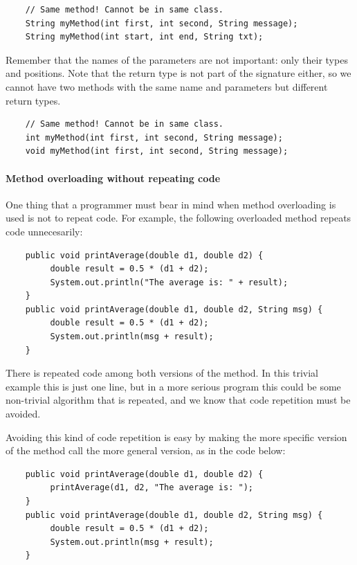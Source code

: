 \begin{verbatim}
    // Same method! Cannot be in same class.
    String myMethod(int first, int second, String message);
    String myMethod(int start, int end, String txt);
\end{verbatim}

Remember that the names of the parameters are not important: only their types and
positions. Note that the return type is not part of the signature
either, so we cannot have two methods with the same name and
parameters but different return types. 

\begin{verbatim}
    // Same method! Cannot be in same class.
    int myMethod(int first, int second, String message);
    void myMethod(int first, int second, String message);
\end{verbatim}

\paragraph{Method overloading without repeating code}
\label{sec:meth-overl-with}

One thing that a programmer must bear in mind when method overloading
is used is not to repeat code. For example, the following overloaded
method repeats code unnecesarily: 

\begin{verbatim}
    public void printAverage(double d1, double d2) {
         double result = 0.5 * (d1 + d2);
         System.out.println("The average is: " + result);
    }
    public void printAverage(double d1, double d2, String msg) {
         double result = 0.5 * (d1 + d2);
         System.out.println(msg + result);
    }
\end{verbatim}

There is repeated code among both versions of the method. In this
trivial example this is just one line, but in a more serious program
this could be some non-trivial algorithm that is repeated, and we know
that code repetition must be avoided. 

Avoiding this kind of code repetition is easy by making the more
specific version of the method call the more general version, as in
the code below: 

\begin{verbatim}
    public void printAverage(double d1, double d2) {
         printAverage(d1, d2, "The average is: ");
    }
    public void printAverage(double d1, double d2, String msg) {
         double result = 0.5 * (d1 + d2);
         System.out.println(msg + result);
    }
\end{verbatim}


